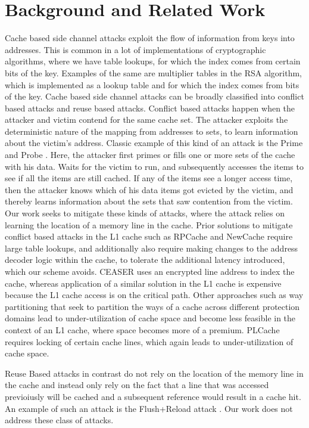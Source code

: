 \section{Background and Related Work}
Cache based side channel attacks exploit the flow of information from keys into addresses. This is common in a lot of implementations of cryptographic algorithms, where we have table lookups, for which the index comes from certain bits of the key. Examples of the same are multiplier tables in the RSA algorithm, which is implemented as a lookup table and for which the index comes from bits of the key. \cite{rfill}
Cache based side channel attacks can be broadly classified into conflict based attacks and reuse based attacks. 
Conflict based attacks happen when the attacker and victim contend for the same cache set. The attacker exploits the deterministic nature of the mapping from addresses to sets, to learn information about the victim's address. Classic example of this kind of an attack is the Prime and Probe \cite{p+p}. Here, the attacker first primes or fills one or more sets of the cache with his data. Waits for the victim to run, and subsequently accesses the items to see if all the items are still cached. If any of the items see a longer access time, then the attacker knows which of his data items got evicted by the victim, and thereby learns information about the sets that saw contention from the victim. Our work seeks to mitigate these kinds of attacks, where the attack relies on learning the location of a memory line in the cache. 
Prior solutions to mitigate conflict based attacks in the L1 cache such as RPCache \cite{RPCache} and NewCache \cite{NewCache} require large table lookups, and additionally also require making changes to the address decoder logic within the cache, to tolerate the additional latency introduced, which our scheme avoids. CEASER \cite{ceaser} uses an encrypted line address to index the cache, whereas application of a similar solution in the L1 cache is expensive because the L1 cache access is on the critical path. Other approaches such as way partitioning that seek to partition the ways of a cache across different protection domains \cite{NoMo, DAWG} lead to under-utilization of cache space and become less feasible in the context of an L1 cache, where space becomes more of a premium. PLCache \cite{PLCache} requires locking of certain cache lines, which again leads to under-utilization of cache space.

Reuse Based attacks in contrast do not rely on the location of the memory line in the cache and instead only rely on the fact that a line that was accessed previoiusly will be cached and a subsequent reference would result in a cache hit. An example of such an attack is the Flush+Reload attack \cite{F+F}. Our work does not address these class of attacks. 
